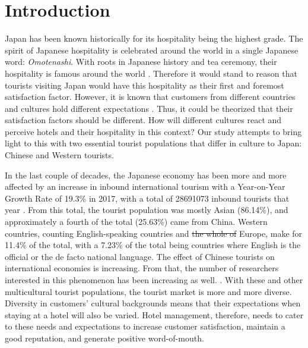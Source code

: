 \documentclass[smallextended,natbib]{svjour3}       %
\providecommand{\DIFdel}[1]{{\protect\color{red}\sout{#1}}}                      %
\providecommand{\DIFaddbegin}{} %
\providecommand{\DIFaddend}{} %
\providecommand{\DIFdelbegin}{} %
\providecommand{\DIFdelend}{} %
\begin{document}
\linenumbers

\section{Introduction}\label{intro}

  Japan has been known historically for its hospitality being the highest grade. The spirit of Japanese hospitality is celebrated around the world in a single Japanese word: \textit{Omotenashi}. With roots in Japanese history and tea ceremony, their hospitality is famous around the world \DIFdelbegin %
\DIFdelend \DIFaddbegin \cite[][]{al2015characteristics}\DIFaddend . Therefore it would stand to reason that tourists visiting Japan would have this hospitality as their first and foremost satisfaction factor. However, it is known that customers from different countries and cultures hold different expectations \DIFdelbegin %
\DIFdelend \DIFaddbegin \cite[][]{engel1990}\DIFaddend . Thus, it could be theorized that their satisfaction factors should be different. How will different cultures react and perceive hotels and their hospitality in this context? Our study attempts to bring light to this with two essential tourist populations that differ in culture to Japan: Chinese and Western tourists. 

  In the last couple of decades, the Japanese economy has been more and more affected by an increase in inbound international tourism \cite[][]{jones2009} with a Year-on-Year Growth Rate of 19.3\% in 2017, with a total of \num[group-separator={,}]{28691073} inbound tourists that year \cite[][]{jnto2003-2019}. From this total, the tourist population was mostly Asian (86.14\%), and approximately a fourth of the total (25.63\%) came from China. Western countries, counting English-speaking countries and \DIFdelbegin \DIFdel{the whole of }\DIFdelend Europe, make for 11.4\% of the total, with a 7.23\% of the total being countries where English is the official or the de facto national language. The effect of Chinese tourists on international economies is increasing. From that, the number of researchers interested in this phenomenon has been increasing as well. \cite[][]{sun2017}. With these and other multicultural tourist populations, the tourist market is more and more diverse. Diversity in customers' cultural backgrounds means that their expectations when staying at a hotel will also be varied. Hotel management, therefore, needs to cater to these needs and expectations to increase customer satisfaction, maintain a good reputation, and generate positive word-of-mouth.
\end{document}
